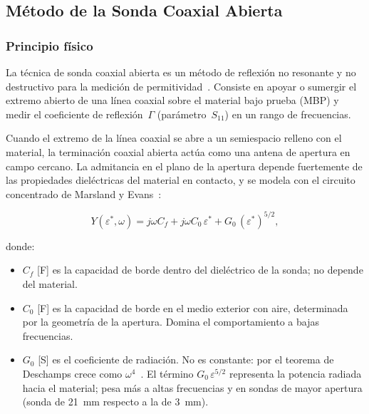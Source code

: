 \newpage
\Encabezado

\subsection{Método de la Sonda Coaxial Abierta}
\label{sec:sonda_coaxial}

\subsubsection{Principio físico}

La técnica de sonda coaxial abierta es un método de reflexión no resonante
y no destructivo para la medición de permitividad~\cite{stuchly1980, misra1990}.
Consiste en apoyar o sumergir el extremo abierto de una línea coaxial sobre
el material bajo prueba (MBP) y medir el coeficiente de reflexión~$\Gamma$
(parámetro~$S_{11}$) en un rango de frecuencias.

Cuando el extremo de la línea coaxial se abre a un semiespacio relleno con
el material, la terminación coaxial abierta actúa como una antena de apertura
en campo cercano. La admitancia en el plano de la apertura depende fuertemente de
las propiedades dieléctricas del material en contacto, y se modela con el circuito
concentrado de Marsland y Evans~\cite{marsland1987}:

\begin{equation}
    Y(\varepsilon^*, \omega)
    = j\omega C_f
    + j\omega C_0\,\varepsilon^*
    + G_0\,(\varepsilon^*)^{5/2},
    \label{eq:admitancia_modelo}
\end{equation}

\noindent donde:
\begin{itemize}
    \item $C_f$ [F] es la capacidad de borde dentro del dieléctrico de la sonda;
          no depende del material.
    \item $C_0$ [F] es la capacidad de borde en el medio exterior con aire,
          determinada por la geometría de la apertura. Domina el comportamiento a
          bajas frecuencias.
    \item $G_0$ [S] es el coeficiente de radiación. No es constante: por el
          teorema de Deschamps crece como $\omega^4$~\cite{marcuvitz}. El término
          $G_0\,\varepsilon^{5/2}$ representa la potencia radiada hacia el material;
          pesa más a altas frecuencias y en sondas de mayor apertura (sonda de
          21~mm respecto a la de 3~mm).
\end{itemize}

